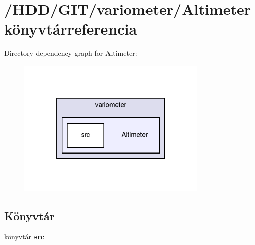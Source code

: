 \section{/\-H\-D\-D/\-G\-I\-T/variometer/\-Altimeter könyvtárreferencia}
\label{dir_22f52a22359d8e5ed18ab6d4b4518e1f}
Directory dependency graph for Altimeter\-:
\nopagebreak
\begin{figure}[H]
\begin{center}
\leavevmode
\includegraphics[width=256pt]{dir_22f52a22359d8e5ed18ab6d4b4518e1f_dep}
\end{center}
\end{figure}
\subsection*{Könyvtár}
\begin{DoxyCompactItemize}
\item 
könyvtár {\bf src}
\end{DoxyCompactItemize}

